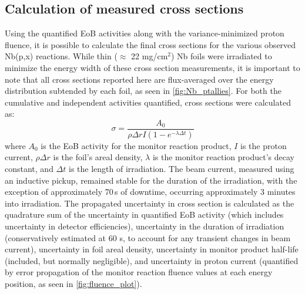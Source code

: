 \documentclass[3p]{elsarticle}
\newcommand{\pp}[1]{\left( #1\right)}
\begin{document}





\subsection{Calculation of measured cross sections}\label{sec:calcs_sec}


Using the quantified EoB activities along with the variance-minimized proton fluence, it is possible to calculate the final cross sections for the various observed Nb(p,x) reactions.
While thin ($\approx$ 22 mg/cm$^2$) Nb foils were irradiated to minimize the energy width of these cross section measurements, it is important to note that all cross sections reported here are flux-averaged  
over the energy distribution subtended by each foil, as seen in \autoref{fig:Nb_ptallies}.
For both the cumulative and independent activities quantified, cross sections were calculated as:
\begin{equation}
\sigma = \dfrac{A_0 }{\rho \Delta r I \pp{1-e^{-\lambda \Delta t}} }
\end{equation}
where $A_0$ is the EoB activity for the monitor reaction product, $I$ is the proton current, $\rho \Delta r$ is the foil's areal density, $\lambda$ is the monitor reaction product's decay constant, and $\Delta t$ is the length of irradiation.
The beam current, measured using an inductive pickup, remained stable for the duration of the irradiation, with the exception of approximately 70\,s of downtime,  occurring approximately 3 minutes into irradiation.
The propagated uncertainty in cross section is calculated as the quadrature sum of the uncertainty in quantified EoB activity (which includes uncertainty in detector efficiencies), uncertainty in the duration of irradiation (conservatively estimated at 60 s, to account for any transient changes in beam current), uncertainty in foil areal density, uncertainty in monitor product half-life (included, but normally negligible),  and uncertainty in proton current (quantified by error propagation of the monitor reaction fluence values  at each energy position, as seen in \autoref{fig:fluence_plot}).


\end{document}

